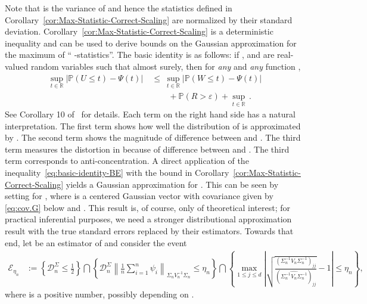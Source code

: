 \documentclass{article}
\begin{document}
Note that   is the variance of   and hence the statistics defined in Corollary~\ref{cor:Max-Statistic-Correct-Scaling} are normalized by their standard deviation. Corollary~\ref{cor:Max-Statistic-Correct-Scaling} is a deterministic inequality and can be used to derive bounds on the Gaussian approximation for the maximum of `` -statistics''. The basic identity is as follows: if  ,   and   are real-valued random variables such that   almost surely, then for \emph{any}   and \emph{any} function  ,
\begin{equation}\label{eq:basic-identity-BE}
\begin{split}
\sup_{t\in\mathbb{R}}|\mathbb{P}(U \le t) - \Psi(t)| ~&\le~ \sup_{t\in\mathbb{R}}|\mathbb{P}(W \le t) - \Psi(t)|\\ &\qquad+ \mathbb{P}(R > \varepsilon) + \sup_{t\in\mathbb{R}}\,.
\end{split}
\end{equation}
See Corollary 10 of~\cite{paulauskas1996rates} for details.
Each term on the right hand side has a natural interpretation. The first term shows how well the distribution of   is approximated by  . The second term shows the magnitude of difference between   and  . The third term measures the distortion in   because of difference between   and  . The third term corresponds to anti-concentration.
A direct application of the inequality~\eqref{eq:basic-identity-BE} with the bound in Corollary~\ref{cor:Max-Statistic-Correct-Scaling} yields a Gaussian approximation for  . This can be seen by
setting   for  ,
where   is a centered Gaussian vector with covariance given by \eqref{eq:cov.G} below and  .
This result is, of course, only of theoretical interest;
for practical inferential purposes, we need a stronger distributional approximation result with the true standard errors replaced by their estimators. Towards that end, let   be an estimator of   and consider the event
\begin{equation}\label{eq:key.event}
\begin{split}
\mathcal{E}_{\eta_n} &:= \left\{\mathcal{D}_n^{\Sigma} \le
\frac{1}{2}\right\} \bigcap
\left\{\mathcal{D}_n^{\Sigma}\left\|\frac{1}{n}\sum_{i=1}^n
\psi_i\right\|_{\Sigma_n V^{-1}_n\Sigma_n} \le
\eta_n\right\}
\bigcap\left\{\max_{1\le j\le
d}
\left|\sqrt{\frac{(\Sigma_n^{-1}V_n\Sigma_n^{-1})_{jj}}{(\widehat{\Sigma_n^{-1}V_n\Sigma_n^{-1}})_{jj}}}- 1\right| \le \eta_n\right\},
\end{split}
\end{equation}
where   is a positive number, possibly depending on  .
\end{document}
